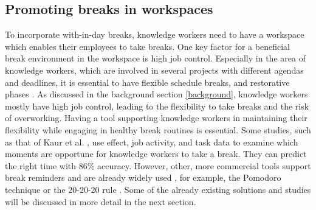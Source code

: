 \documentclass{hasel_thesis}
\begin{document}
\subsection{Promoting breaks in workspaces}
To incorporate with-in-day breaks, knowledge workers need to have a workspace which enables their employees to take breaks. One key factor for a beneficial break environment in the workspace is high job control. Especially in the area of knowledge workers, which are involved in several projects with different agendas and deadlines, it is essential to have flexible schedule breaks, and restorative phases \cite{Trougakos.2009}. As discussed in the background section \ref{background}, knowledge workers mostly have high job control, leading to the flexibility to take breaks and the risk of overworking. Having a tool supporting knowledge workers in maintaining their flexibility while engaging in healthy break routines is essential. Some studies, such as that of Kaur et al. \cite{Kaur.2020}, use effect, job activity, and task data to examine which moments are opportune for knowledge workers to take a break. They can predict the right time with 86\% accuracy. However, other, more commercial tools support break reminders and are already widely used \cite{Alghamdi.2020}, for example, the Pomodoro technique \cite{Cirillo.2006} or the 20-20-20 rule \cite{Min.2019}. Some of the already existing solutions and studies will be discussed in more detail in the next section.
 

\end{document}
